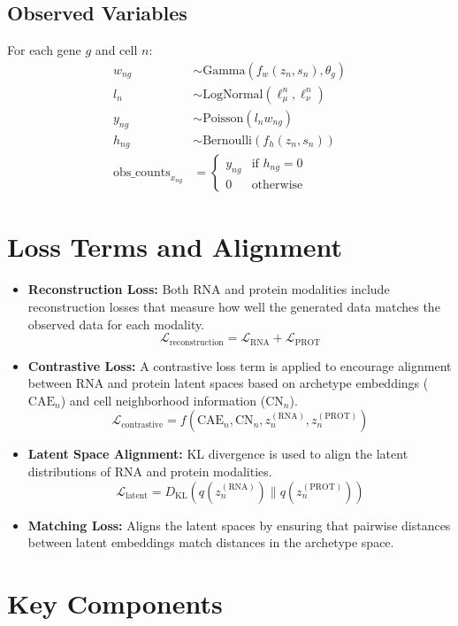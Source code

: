 \documentclass{article}
\begin{document}
\subsection*{Observed Variables}
For each gene $g$ and cell $n$:
\begin{align*}
w_{ng} &\sim \text{Gamma}(f_w(z_n, s_n), \theta_g) \\
l_n &\sim \text{LogNormal}(\ell_\mu^n, \ell_\nu^n) \\
y_{ng} &\sim \text{Poisson}(l_n w_{ng}) \\
h_{ng} &\sim \text{Bernoulli}(f_h(z_n, s_n)) \\
\text{obs\_counts}_{x_{ng}} &=
\begin{cases}
  y_{ng} & \text{if } h_{ng} = 0 \\
  0 & \text{otherwise}
\end{cases}
\end{align*}

\section*{Loss Terms and Alignment}

\begin{itemize}
    \item \textbf{Reconstruction Loss:} Both RNA and protein modalities include reconstruction losses that measure how well the generated data matches the observed data for each modality.
    \[
    \mathcal{L}_{\text{reconstruction}} = \mathcal{L}_{\text{RNA}} + \mathcal{L}_{\text{PROT}}
    \]
    \item \textbf{Contrastive Loss:} A contrastive loss term is applied to encourage alignment between RNA and protein latent spaces based on archetype embeddings (\(\text{CAE}_n\)) and cell neighborhood information (\(\text{CN}_n\)).
    \[
    \mathcal{L}_{\text{contrastive}} = f(\text{CAE}_n, \text{CN}_n, z^{(\text{RNA})}_n, z^{(\text{PROT})}_n)
    \]
    \item \textbf{Latent Space Alignment:} KL divergence is used to align the latent distributions of RNA and protein modalities.
    \[
    \mathcal{L}_{\text{latent}} = D_{\text{KL}}(q(z^{(\text{RNA})}_n) \| q(z^{(\text{PROT})}_n))
    \]
    \item \textbf{Matching Loss:} Aligns the latent spaces by ensuring that pairwise distances between latent embeddings match distances in the archetype space.
\end{itemize}

\section*{Key Components}
\end{document}
